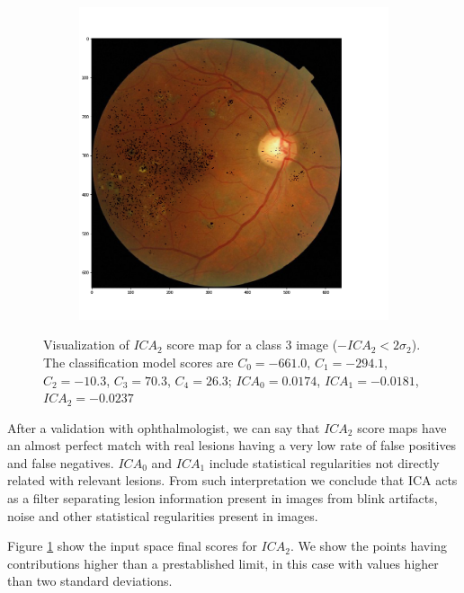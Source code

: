 \begin{figure}[h!]
	\centering
	\begin{subfigure}[b]{\textwidth}
		\centering
		\includegraphics[width=\textwidth]{Figures/chapter_ica/figures/c3/retina_mICA2.png}
	\end{subfigure}
	\caption[$ICA_2$ score map for a class 3 image]{Visualization of $ICA_2$ score map for a class 3 image ($-ICA_2 < 2 \sigma_2$). The classification model scores are $C_0 = -661.0$, $C_1 = -294.1$,  $C_2 = -10.3$,   $C_3 = 70.3$,   $C_4 = 26.3$; $ICA_0 = 0.0174$, $ICA_1 = -0.0181$, $ICA_2 = -0.0237$}  
	\label{fig:ica_components_c3} 
\end{figure}

After a validation with ophthalmologist, we can say that $ICA_2$ score maps have an almost perfect match with real lesions having a very low rate of false positives and false negatives. $ICA_0$ and $ICA_1$ include statistical regularities not directly related with relevant lesions. From such interpretation we conclude that ICA acts as a filter separating lesion information present in images from blink artifacts, noise and other statistical regularities present in images.

Figure \ref{fig:ica_components_c3} show the input space final scores for $ICA_2$. We show the points having contributions higher than a prestablished limit, in this case with values higher than two standard deviations. 


